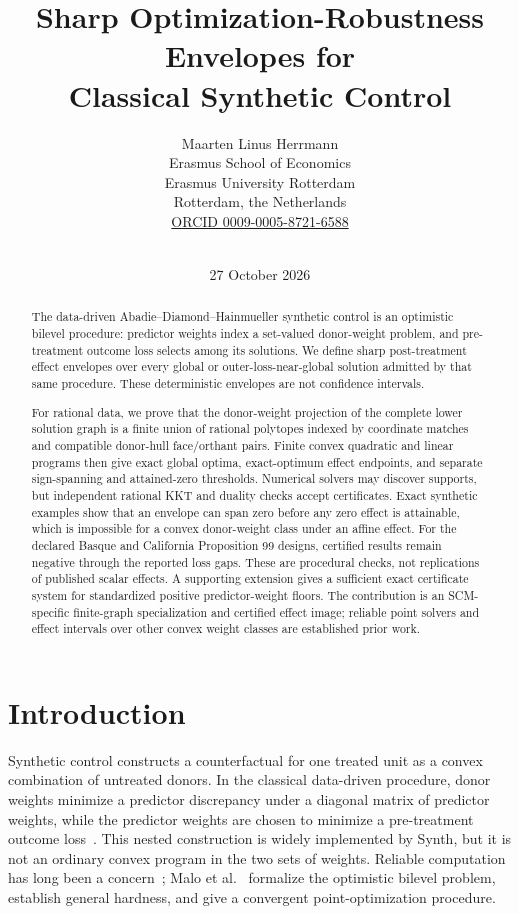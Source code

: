 \documentclass[10pt]{article}
\title{Sharp Optimization-Robustness Envelopes for\\
Classical Synthetic Control}
\author{Maarten Linus Herrmann\\
\small Erasmus School of Economics\\
\small Erasmus University Rotterdam\\
\small Rotterdam, the Netherlands\\
\small\href{https://orcid.org/0009-0005-8721-6588}{ORCID 0009-0005-8721-6588}}
\date{\statusline\\27 October 2026}
\theoremstyle{definition}
\begin{document}
\maketitle
\vspace{-1.25em}

\begin{abstract}
The data-driven Abadie--Diamond--Hainmueller synthetic control is an optimistic
bilevel procedure: predictor weights index a set-valued donor-weight problem,
and pre-treatment outcome loss selects among its solutions.  We define sharp
post-treatment effect envelopes over every global or outer-loss-near-global
solution admitted by that same procedure.  These deterministic envelopes are
not confidence intervals.

For rational data, we prove that the donor-weight projection of the complete
lower solution graph is a finite union of rational polytopes indexed by
coordinate matches and compatible donor-hull face/orthant pairs.  Finite convex
quadratic and linear programs then give exact global optima, exact-optimum
effect endpoints, and separate sign-spanning and attained-zero thresholds.
Numerical solvers may discover supports, but independent rational KKT and
duality checks accept certificates.  Exact synthetic examples show that an
envelope can span zero before any zero effect is attainable, which is
impossible for a convex donor-weight class under an affine effect.  For the declared Basque and California Proposition 99 designs, certified
results remain negative through the reported loss gaps. These are procedural
checks, not replications of published scalar effects.  A supporting extension gives a sufficient exact
certificate system for standardized positive predictor-weight floors.  The
contribution is an SCM-specific finite-graph specialization and certified
effect image; reliable point solvers and effect intervals over other convex
weight classes are established prior work.
\end{abstract}

\section{Introduction}

Synthetic control constructs a counterfactual for one treated unit as a convex
combination of untreated donors.  In the classical data-driven procedure,
donor weights minimize a predictor discrepancy under a diagonal matrix of
predictor weights, while the predictor weights are chosen to minimize a
pre-treatment outcome loss~\cite{abadie2003,abadie2010,abadie2011}.  This
nested construction is widely implemented by \textsf{Synth}, but it is not an
ordinary convex program in the two sets of weights.  Reliable computation has
long been a concern~\cite{becker2018,albalate2021}; Malo et al.~\cite{malo2024}
formalize the optimistic bilevel problem, establish general hardness, and give
a convergent point-optimization procedure.
\end{document}
